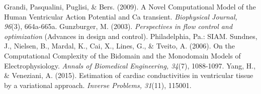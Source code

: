 \documentclass[12pt,a4paper]{article}
\begin{document}
\begin{thebibliography}{99}
 Grandi, Pasqualini, Puglisi, \& Bers. (2009). A Novel Computational Model of the Human Ventricular Action Potential and Ca transient. \textit{Biophysical Journal, 96}(3), 664a-665a.
 Gunzburger, M. (2003). \textit{Perspectives in flow control and optimization} (Advances in design and control). Philadelphia, Pa.: SIAM.
 Sundnes, J., Nielsen, B., Mardal, K., Cai, X., Lines, G., \& Tveito, A. (2006). On the Computational Complexity of the Bidomain and the Monodomain Models of Electrophysiology. \textit{Annals of Biomedical Engineering, 34}(7), 1088-1097.
 Yang, H., \& Veneziani, A. (2015). Estimation of cardiac conductivities in ventricular tissue by a variational approach. \textit{Inverse Problems, 31}(11), 115001.
\end{thebibliography}
\end{document}
